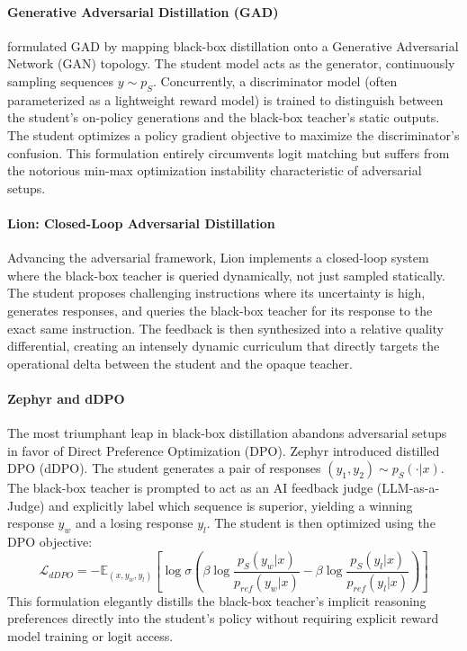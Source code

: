 \documentclass{article} %
\begin{document}
\paragraph{Generative Adversarial Distillation (GAD)}
\citet{2511.10643} formulated GAD by mapping black-box distillation onto a Generative Adversarial Network (GAN) topology. The student model acts as the generator, continuously sampling sequences $y \sim p_S$. Concurrently, a discriminator model (often parameterized as a lightweight reward model) is trained to distinguish between the student's on-policy generations and the black-box teacher's static outputs. The student optimizes a policy gradient objective to maximize the discriminator's confusion. This formulation entirely circumvents logit matching but suffers from the notorious min-max optimization instability characteristic of adversarial setups.

\paragraph{Lion: Closed-Loop Adversarial Distillation}
Advancing the adversarial framework, Lion \citep{2310.01382} implements a closed-loop system where the black-box teacher is queried dynamically, not just sampled statically. The student proposes challenging instructions where its uncertainty is high, generates responses, and queries the black-box teacher for its response to the exact same instruction. The feedback is then synthesized into a relative quality differential, creating an intensely dynamic curriculum that directly targets the operational delta between the student and the opaque teacher.

\paragraph{Zephyr and dDPO}
The most triumphant leap in black-box distillation abandons adversarial setups in favor of Direct Preference Optimization (DPO). Zephyr \citep{2310.06694} introduced distilled DPO (dDPO). The student generates a pair of responses $(y_1, y_2) \sim p_S(\cdot|x)$. The black-box teacher is prompted to act as an AI feedback judge (LLM-as-a-Judge) and explicitly label which sequence is superior, yielding a winning response $y_w$ and a losing response $y_l$. The student is then optimized using the DPO objective:
\begin{equation}
    \mathcal{L}_{dDPO} = - \mathbb{E}_{(x, y_w, y_l)} \left[ \log \sigma \left( \beta \log \frac{p_S(y_w|x)}{p_{ref}(y_w|x)} - \beta \log \frac{p_S(y_l|x)}{p_{ref}(y_l|x)} \right) \right]
\end{equation}
This formulation elegantly distills the black-box teacher's implicit reasoning preferences directly into the student's policy without requiring explicit reward model training or logit access.
\end{document}
